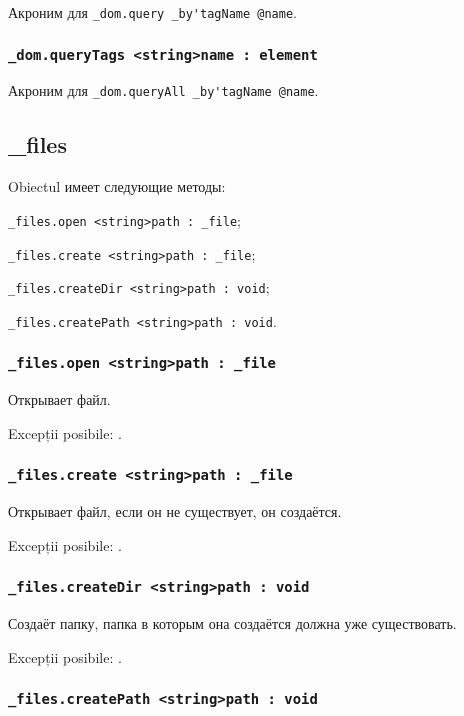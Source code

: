 Акроним для \lstinline|_dom.query _by'tagName @name|.

\subsubsection{\lstinline|_dom.queryTags <string>name : element|}

Акроним для \lstinline|_dom.queryAll _by'tagName @name|.

\subsection{{\color{orange} \_files}}

Obiectul \files{} имеет следующие методы:
\begin{icItems}
	\item \lstinline|_files.open <string>path : _file|;
	\item \lstinline|_files.create <string>path : _file|;
	\item \lstinline|_files.createDir <string>path : void|;
	\item \lstinline|_files.createPath <string>path : void|.
\end{icItems}

\subsubsection{\lstinline|_files.open <string>path : _file|}

Открывает файл.

Excepții posibile: .

\subsubsection{\lstinline|_files.create <string>path : _file|}

Открывает файл, если он не существует, он создаётся.

Excepții posibile: .

\subsubsection{\lstinline|_files.createDir <string>path : void|}

Создаёт папку, папка в которым она создаётся должна уже существовать.

Excepții posibile: .

\subsubsection{\lstinline|_files.createPath <string>path : void|}

